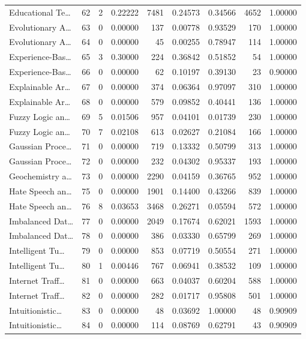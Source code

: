 \begin{table}
\begin{tabular}{lrrrrrrrr}
Educational Te… & 62 & 2 & 0.22222 & 7481 & 0.24573 & 0.34566 & 4652 & 1.00000 \\
Evolutionary A… & 63 & 0 & 0.00000 & 137 & 0.00778 & 0.93529 & 170 & 1.00000 \\
Evolutionary A… & 64 & 0 & 0.00000 & 45 & 0.00255 & 0.78947 & 114 & 1.00000 \\
Experience-Bas… & 65 & 3 & 0.30000 & 224 & 0.36842 & 0.51852 & 54 & 1.00000 \\
Experience-Bas… & 66 & 0 & 0.00000 & 62 & 0.10197 & 0.39130 & 23 & 0.90000 \\
Explainable Ar… & 67 & 0 & 0.00000 & 374 & 0.06364 & 0.97097 & 310 & 1.00000 \\
Explainable Ar… & 68 & 0 & 0.00000 & 579 & 0.09852 & 0.40441 & 136 & 1.00000 \\
Fuzzy Logic an… & 69 & 5 & 0.01506 & 957 & 0.04101 & 0.01739 & 230 & 1.00000 \\
Fuzzy Logic an… & 70 & 7 & 0.02108 & 613 & 0.02627 & 0.21084 & 166 & 1.00000 \\
Gaussian Proce… & 71 & 0 & 0.00000 & 719 & 0.13332 & 0.50799 & 313 & 1.00000 \\
Gaussian Proce… & 72 & 0 & 0.00000 & 232 & 0.04302 & 0.95337 & 193 & 1.00000 \\
Geochemistry a… & 73 & 0 & 0.00000 & 2290 & 0.04159 & 0.36765 & 952 & 1.00000 \\
Hate Speech an… & 75 & 0 & 0.00000 & 1901 & 0.14400 & 0.43266 & 839 & 1.00000 \\
Hate Speech an… & 76 & 8 & 0.03653 & 3468 & 0.26271 & 0.05594 & 572 & 1.00000 \\
Imbalanced Dat… & 77 & 0 & 0.00000 & 2049 & 0.17674 & 0.62021 & 1593 & 1.00000 \\
Imbalanced Dat… & 78 & 0 & 0.00000 & 386 & 0.03330 & 0.65799 & 269 & 1.00000 \\
Intelligent Tu… & 79 & 0 & 0.00000 & 853 & 0.07719 & 0.50554 & 271 & 1.00000 \\
Intelligent Tu… & 80 & 1 & 0.00446 & 767 & 0.06941 & 0.38532 & 109 & 1.00000 \\
Internet Traff… & 81 & 0 & 0.00000 & 663 & 0.04037 & 0.60204 & 588 & 1.00000 \\
Internet Traff… & 82 & 0 & 0.00000 & 282 & 0.01717 & 0.95808 & 501 & 1.00000 \\
Intuitionistic… & 83 & 0 & 0.00000 & 48 & 0.03692 & 1.00000 & 48 & 0.90909 \\
Intuitionistic… & 84 & 0 & 0.00000 & 114 & 0.08769 & 0.62791 & 43 & 0.90909 \\

\end{tabular}
\end{table}
